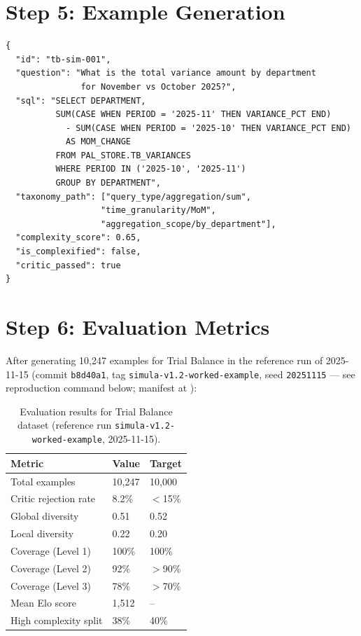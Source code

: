 \section{Step 5: Example Generation}

\begin{lstlisting}[language=jsonx,caption={Generated training example}]
{
  "id": "tb-sim-001",
  "question": "What is the total variance amount by department 
               for November vs October 2025?",
  "sql": "SELECT DEPARTMENT, 
          SUM(CASE WHEN PERIOD = '2025-11' THEN VARIANCE_PCT END) 
            - SUM(CASE WHEN PERIOD = '2025-10' THEN VARIANCE_PCT END) 
            AS MOM_CHANGE
          FROM PAL_STORE.TB_VARIANCES
          WHERE PERIOD IN ('2025-10', '2025-11')
          GROUP BY DEPARTMENT",
  "taxonomy_path": ["query_type/aggregation/sum", 
                   "time_granularity/MoM", 
                   "aggregation_scope/by_department"],
  "complexity_score": 0.65,
  "is_complexified": false,
  "critic_passed": true
}
\end{lstlisting}

\section{Step 6: Evaluation Metrics}

After generating 10,247 examples for Trial Balance in the reference
run of 2025-11-15 (commit \texttt{b8d40a1},
tag \texttt{simula-v1.2-worked-example}, seed \texttt{20251115} ---
see reproduction command below; manifest at
):

\begin{table}[H]
\centering
\caption{Evaluation results for Trial Balance dataset
(reference run \texttt{simula-v1.2-worked-example}, 2025-11-15).}
\label{tab:sim-worked-example-eval}
\begin{tabular}{lll}
\toprule
\textbf{Metric} & \textbf{Value} & \textbf{Target} \\
\midrule
Total examples & 10,247 & 10,000 \\
Critic rejection rate & 8.2\% & $<$15\% \\
Global diversity & 0.51 & 0.52 \\
Local diversity & 0.22 & 0.20 \\
Coverage (Level 1) & 100\% & 100\% \\
Coverage (Level 2) & 92\% & $>$90\% \\
Coverage (Level 3) & 78\% & $>$70\% \\
Mean Elo score & 1,512 & -- \\
High complexity split & 38\% & 40\% \\
\bottomrule
\end{tabular}
\end{table}

